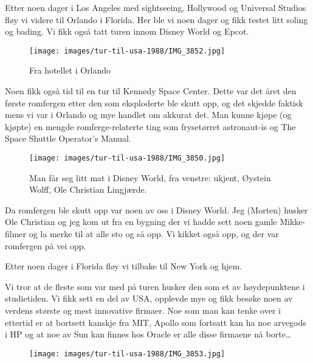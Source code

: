 Etter noen dager i Los Angeles med sightseeing, Hollywood og Universal Studios fløy vi videre til Orlando i Florida. Her ble vi noen dager og fikk testet litt soling og bading. Vi fikk også tatt turen innom Disney World og Epcot.

\begin{figure}
	\texttt{[image: images/tur-til-usa-1988/IMG\_3852.jpg]}
	\caption{Fra hotellet i Orlando}
\end{figure}

Noen fikk også tid til en tur til Kennedy Space Center. Dette var det året den første romfergen etter den som eksploderte ble skutt opp, og det skjedde faktisk mens vi var i Orlando og mye handlet om akkurat det. Man kunne kjøpe (og kjøpte) en mengde romferge-relaterte ting som frysetørret astronaut-is og The Space Shuttle Operator’s Manual.

\begin{figure}
	\texttt{[image: images/tur-til-usa-1988/IMG\_3850.jpg]}
	\caption{Man får seg litt mat i Disney World, fra venstre: ukjent, Øystein Wolff, Ole Christian Lingjærde.}
\end{figure}

Da romfergen ble skutt opp var noen av oss i Disney World. Jeg (Morten) husker Ole Christian og jeg kom ut fra en bygning der vi hadde sett noen gamle Mikke-filmer og la merke til at alle sto og så opp. Vi kikket også opp, og der var romfergen på vei opp.

Etter noen dager i Florida fløy vi tilbake til New York og hjem.

Vi tror at de fleste som var med på turen husker den som et av høydepunktene i studietiden. Vi fikk sett en del av USA, opplevde mye og fikk besøke noen av verdens største og mest innovative firmaer. Noe som man kan tenke over i ettertid er at bortsett kanskje fra MIT, Apollo som fortsatt kan ha noe arvegods i HP og at noe av Sun kan finnes hos Oracle er alle disse firmaene nå borte…

\begin{figure}
	\texttt{[image: images/tur-til-usa-1988/IMG\_3853.jpg]}
\end{figure}

